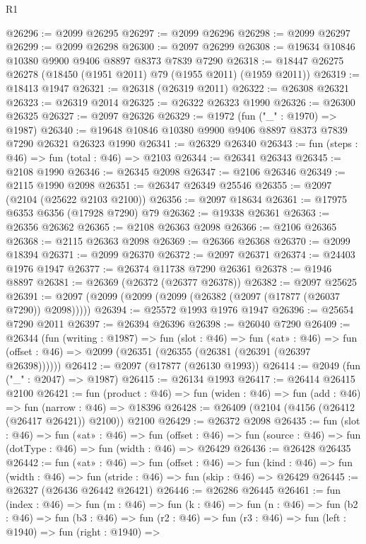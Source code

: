 \begin{lexlean}{R1}
\begin{coremodule}
@26296 := @2099 @26295
@26297 := @2099 @26296
@26298 := @2099 @26297
@26299 := @2099 @26298
@26300 := @2097 @26299
@26308 := @19634 @10846 @10380 @9900 @9406 @8897 @8373 @7839 @7290
@26318 := @18447 @26275 @26278 (@18450 (@1951 @2011) @79 (@1955 @2011) (@1959 @2011))
@26319 := @18413 @1947
@26321 := @26318 (@26319 @2011)
@26322 := @26308 @26321
@26323 := @26319 @2014
@26325 := @26322 @26323 @1990
@26326 := @26300 @26325
@26327 := @2097 @26326
@26329 := @1972 (fun ("_" : @1970) => @1987)
@26340 := @19648 @10846 @10380 @9900 @9406 @8897 @8373 @7839 @7290 @26321 @26323 @1990
@26341 := @26329 @26340
@26343 := fun (steps : @46) => fun (total : @46) => @2103
@26344 := @26341 @26343
@26345 := @2108 @1990
@26346 := @26345 @2098
@26347 := @2106 @26346
@26349 := @2115 @1990 @2098
@26351 := @26347 @26349 @25546
@26355 := @2097 (@2104 (@25622 @2103 @2100))
@26356 := @2097 @18634
@26361 := @17975 @6353 @6356 (@17928 @7290) @79
@26362 := @19338 @26361
@26363 := @26356 @26362
@26365 := @2108 @26363 @2098
@26366 := @2106 @26365
@26368 := @2115 @26363 @2098
@26369 := @26366 @26368
@26370 := @2099 @18394
@26371 := @2099 @26370
@26372 := @2097 @26371
@26374 := @24403 @1976 @1947
@26377 := @26374 @11738 @7290 @26361
@26378 := @1946 @8897
@26381 := @26369 (@26372 (@26377 @26378))
@26382 := @2097 @25625
@26391 := @2097 (@2099 (@2099 (@2099 (@26382 (@2097 (@17877 (@26037 @7290)) @2098)))))
@26394 := @25572 @1993 @1976 @1947
@26396 := @25654 @7290 @2011
@26397 := @26394 @26396
@26398 := @26040 @7290
@26409 := @26344
    (fun (writing : @1987) =>
    fun (slot : @46) =>
    fun («at» : @46) =>
    fun (offset : @46) => @2099 (@26351 (@26355 (@26381 (@26391 (@26397 @26398))))))
@26412 := @2097 (@17877 (@26130 @1993))
@26414 := @2049 (fun ("_" : @2047) => @1987)
@26415 := @26134 @1993
@26417 := @26414 @26415 @2100
@26421 := fun (product : @46) =>
  fun (widen : @46) => fun (add : @46) => fun (narrow : @46) => @18396
@26428 := @26409 (@2104 (@4156 (@26412 (@26417 @26421)) @2100)) @2100
@26429 := @26372 @2098
@26435 := fun (slot : @46) =>
  fun («at» : @46) =>
  fun (offset : @46) => fun (source : @46) => fun (dotType : @46) => fun (width : @46) => @26429
@26436 := @26428 @26435
@26442 := fun («at» : @46) =>
  fun (offset : @46) =>
  fun (kind : @46) => fun (width : @46) => fun (stride : @46) => fun (skip : @46) => @26429
@26445 := @26327 (@26436 @26442 @26421)
@26446 := @26286 @26445
@26461 := fun (index : @46) =>
  fun (m : @46) =>
  fun (k : @46) =>
  fun (n : @46) =>
  fun (b2 : @46) =>
  fun (b3 : @46) =>
  fun (r2 : @46) =>
  fun (r3 : @46) =>
  fun (left : @1940) =>
  fun (right : @1940) =>

\end{coremodule}
\end{lexlean}
